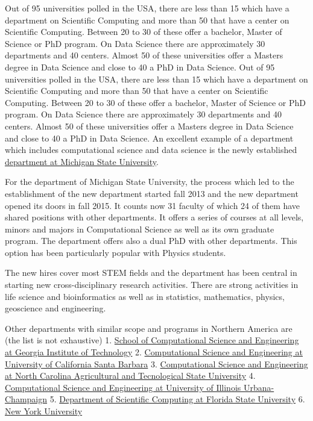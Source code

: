 \documentclass[]{article}
\begin{document}
Out of 95 universities polled in the USA, there are less than 15 which
have a department on Scientific Computing and more than 50 that have a
center on Scientific Computing. Between 20 to 30 of these offer a
bachelor, Master of Science or PhD program. On Data Science there are
approximately 30 departments and 40 centers. Almost 50 of these
universities offer a Masters degree in Data Science and close to 40 a
PhD in Data Science. Out of 95 universities polled in the USA, there are
less than 15 which have a department on Scientific Computing and more
than 50 that have a center on Scientific Computing. Between 20 to 30 of
these offer a bachelor, Master of Science or PhD program. On Data
Science there are approximately 30 departments and 40 centers. Almost 50
of these universities offer a Masters degree in Data Science and close
to 40 a PhD in Data Science. An excellent example of a department which
includes computational science and data science is the newly established
\href{https://cmse.msu.edu/}{department at Michigan State University}.

For the department of Michigan State University, the process which led
to the establishment of the new department started fall 2013 and the new
department opened its doors in fall 2015. It counts now 31 faculty of
which 24 of them have shared positions with other departments. It offers
a series of courses at all levels, minors and majors in Computational
Science as well as its own graduate program. The department offers also
a dual PhD with other departments. This option has been particularly
popular with Physics students.

The new hires cover most STEM fields and the department has been central
in starting new cross-disciplinary research activities. There are strong
activities in life science and bioinformatics as well as in statistics,
mathematics, physics, geoscience and engineering.

Other departments with similar scope and programs in Northern America
are (the list is not exhaustive) 1.
\href{https://www.cse.gatech.edu/}{School of Computational Science and
Engineering at Georgia Institute of Technology} 2.
\href{https://cse.ucsb.edu/}{Computational Science and Engineering at
University of California Santa Barbara} 3.
\href{http://www.ncat.edu/coe/departments/cse/index.html}{Computational
Science and Engineering at North Carolina Agricultural and Tecnological
State University} 4. \href{https://cse.illinois.edu/}{Computational
Science and Engineering at University of Illinois Urbana-Champaign} 5.
\href{https://www.sc.fsu.edu/}{Department of Scientific Computing at
Florida State University} 6. \href{https://datascience.nyu.edu}{New York
University}
\end{document}
